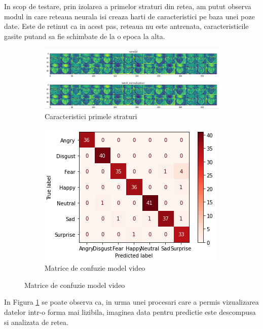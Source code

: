 \documentclass[a4paper, 12pt]{report}
\begin{document}
	In scop de testare, prin izolarea a primelor straturi din retea, am putut observa modul in care reteaua neurala isi creaza harti de caracteristici pe baza unei poze date. Este de retinut ca in acest pas, reteaua nu este antrenata, caracteristicile gasite putand sa fie schimbate de la o epoca la alta.
	
	\begin{figure}
		\centering
		\begin{subfigure}[b]{0.8\textwidth}
			 \includegraphics[width=1\linewidth]{images/video_model_layers_visualisation.png}
			\caption{Caracteristici primele straturi}
			\label{fig:video_model_layers_visualisation}
		\end{subfigure}
		\begin{subfigure}[b]{0.4\textwidth}
			 \includegraphics[width=1\linewidth]{images/audio_confusion_matrix.png}
			\caption{Matrice de confuzie model video}
			\label{fig:video_confusion_matrix}
		\end{subfigure}
	\end{figure}

	In Figura \ref{fig:video_model_layers_visualisation} se poate observa ca, in urma unei procesari care a permis vizualizarea datelor intr-o forma mai lizibila, imaginea data pentru predictie este descompusa si analizata de retea.
	
\end{document}
